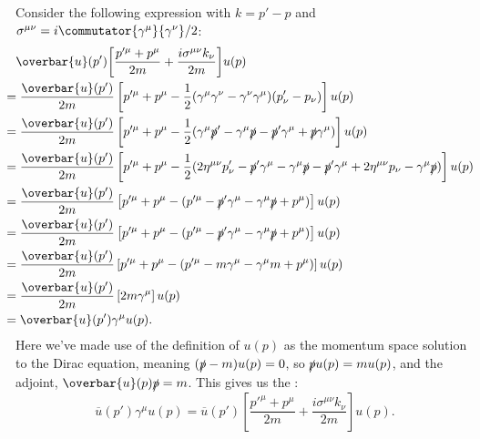 \documentclass[fleqn]{NotesClass}
\newcommand{\diracadjoint}[1]{\overbar{#1}}
\newcommand{\minkowskiMetric}{\eta}
\begin{document}
    Consider the following expression with \(k = p' - p\) and \(\sigma^{\mu\nu} = i\commutator{\gamma^\mu}{\gamma^\nu}/2\):
    \begingroup
    \allowdisplaybreaks
    \begin{align}
        &\diracadjoint{u}(p')\bigg[ \frac{p'^\mu + p^\mu}{2m} + \frac{i\sigma^{\mu\nu}k_\nu}{2m} \bigg]u(p)\\
        &\hspace{-1em}= \frac{\diracadjoint{u}(p')}{2m}\left[ p'^\mu + p^\mu - \frac{1}{2}(\gamma^\mu \gamma^\nu - \gamma^\nu \gamma^\mu)(p'_\nu - p_\nu) \right] u(p)\\
        &\hspace{-1em}= \frac{\diracadjoint{u}(p')}{2m}\left[ p'^\mu + p^\mu - \frac{1}{2}(\gamma^\mu \slashed{p}' - \gamma^\mu \slashed{p} - \slashed{p}' \gamma^\mu + \slashed{p}\gamma^\mu) \right] u(p)\\
        &\hspace{-1em}= \frac{\diracadjoint{u}(p')}{2m}\left[ p'^\mu + p^\mu - \frac{1}{2}(2\minkowskiMetric^{\mu\nu}p'_\nu - \slashed{p}'\gamma^\mu - \gamma^\mu\slashed{p} - \slashed{p}'\gamma^\mu + 2\minkowskiMetric^{\mu\nu}p_\nu - \gamma^\mu \slashed{p}) \right] u(p) \notag\\
        &\hspace{-1em}= \frac{\diracadjoint{u}(p')}{2m}\left[ p'^\mu + p^\mu - (p'^\mu - \slashed{p}'\gamma^\mu - \gamma^\mu \slashed{p} + p^\mu) \right] u(p)\\
        &\hspace{-1em}= \frac{\diracadjoint{u}(p')}{2m}\left[ p'^\mu + p^\mu - (p'^\mu - \slashed{p}'\gamma^\mu - \gamma^\mu \slashed{p} + p^\mu) \right] u(p)\\
        &\hspace{-1em}= \frac{\diracadjoint{u}(p')}{2m}\left[ p'^\mu + p^\mu - (p'^\mu - m\gamma^\mu - \gamma^\mu m + p^\mu) \right] u(p)\\
        &\hspace{-1em}= \frac{\diracadjoint{u}(p')}{2m}\left[ 2m\gamma^\mu \right] u(p)\\
        &\hspace{-1em}= \diracadjoint{u}(p') \gamma^\mu u(p).
    \end{align}
    \endgroup
    Here we've made use of the definition of \(u(p)\) as the momentum space solution to the Dirac equation, meaning \((\slashed{p} - m)u(p) = 0\), so \(\slashed{p}u(p) = mu(p)\), and the adjoint, \(\diracadjoint{u}(p)\slashed{p} = m\).
    This gives us the :
    \begin{equation}
        \diracadjoint{u}(p')\gamma^\mu u(p) = \diracadjoint{u}(p')\left[ \frac{p'^\mu + p^\mu}{2m} + \frac{i\sigma^{\mu\nu}k_\nu}{2m} \right]u(p).
    \end{equation}
    
\end{document}
